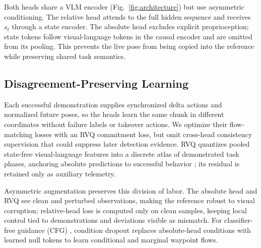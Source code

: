 \documentclass[letterpaper, 10 pt, conference]{ieeeconf}
\begin{document}
Both heads share a VLM encoder (Fig.~\ref{fig:architecture}) but use asymmetric conditioning. The relative head attends to the full hidden sequence and receives $s_t$ through a state encoder. The absolute head excludes explicit proprioception; state tokens follow visual-language tokens in the causal encoder and are omitted from its pooling. This prevents the live pose from being copied into the reference while preserving shared task semantics.

\subsection{Disagreement-Preserving Learning}
Each successful demonstration supplies synchronized delta actions and normalized future poses, so the heads learn the same chunk in different coordinates without failure labels or takeover actions. We optimize their flow-matching losses \cite{pi0} with an RVQ commitment loss, but omit cross-head consistency supervision that could suppress later detection evidence. RVQ quantizes pooled state-free visual-language features into a discrete atlas of demonstrated task phases, anchoring absolute predictions to successful behavior \cite{vqvae,rvq}; its residual is retained only as auxiliary telemetry.

Asymmetric augmentation preserves this division of labor. The absolute head and RVQ see clean and perturbed observations, making the reference robust to visual corruption; relative-head loss is computed only on clean samples, keeping local control tied to demonstrations and deviations visible as mismatch. For classifier-free guidance (CFG) \cite{cfg}, condition dropout replaces absolute-head conditions with learned null tokens to learn conditional and marginal waypoint flows.
\end{document}
